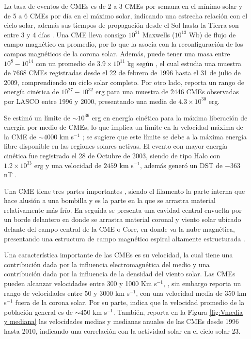 La tasa de eventos de CMEs es de 2 a 3 CMEs por semana en el mínimo solar y de 5 a 6 CMEs por día en el máximo solar, indicando una estrecha relación con el ciclo solar, además sus tiempos de propagación desde el Sol hasta la Tierra son entre 3 y 4 días \parencite[e.g.,][]{lugaz-2017}. Una CME lleva consigo $10^{21}$ Maxwells ($10^{13}$ Wb) de flujo de campo magnético en promedio, por lo que la asocia con la reconfiguración de los campos magnéticos de la corona solar. Además, puede tener una masa entre $10^{8} - 10^{14}$ con un promedio de $3.9\times10^{11}$ kg según \textcite[e.g.,][]{vourlidas-2010}, el cual estudia una muestra de $7668$ CMEs registradas desde el 22 de febrero de 1996 hasta el 31 de julio de 2009, comprendiendo un ciclo solar completo. Por otro lado, \textcite[][]{2002ESASP.506...91V} reporta un rango de energía cinética de $10^{27}-10^{32}$ erg para una muestra de 2446 CMEs observadas por \ac{LASCO} entre 1996 y 2000, presentando una media de $4.3\times10^{30}$ erg.

Se estimó un límite de $\sim 10^{36}$ erg en energía cinética para la máxima liberación de energía por medio de CMEs, lo que implica un límite en la velocidad máxima de la CME de $\sim 4000$ km s$^{-1}$ \parencite[e.g.,][]{gopalswamy2010catalog}; se sugiere que este límite se debe a la máxima energía libre disponible en las regiones solares activas. El evento con mayor energía cinética fue registrado el 28 de Octubre de 2003, siendo de tipo Halo con $1.2\times10^{33}$ erg y una velocidad de $2459$ km s$^{-1}$, además generó un \ac{DST} de $-363$ nT \parencite[e.g,][]{gopalswamy-2005}.

Una CME tiene tres partes importantes \parencite[e.g.,][]{fisher-1981}, siendo el filamento la parte interna que hace alusión a una bombilla y es la parte en la que se arrastra material relativamente más frío. En seguida se presenta una cavidad central envuelta por un borde delantero en donde se arrastra material coronal y viento solar ubicado delante del campo central de la CME o Core, en donde va la nube magnética, presentando una estructura de campo magnético espiral altamente estructurada \textcite[e.g.,][]{2014swcm.book.....H}.

Una característica importante de las \acp{CME} es su velocidad, la cual tiene una contribución dada por la influencia electromagnética del medio y una contribución dada por la influencia de la densidad del viento solar. Las CMEs pueden alcanzar velocidades entre 300 y 1000 Km s$^{-1}$, \parencite[e.g.,][]{2014swcm.book.....H}, sin embargo \textcite[e.g.,][]{zhang-2006} reporta un rango de velocidades entre 50 y 3000 km s$^{-1}$, con una velocidad media de 350 km s$^{-1}$ fuera de la corona solar. Por su parte, \textcite[e.g.,][]{gopalswamy-2004} indica que la velocidad promedio de la población general es de $\sim 450$ km s$^{-1}$. También, \textcite[e.g.,][]{webb-2012} reporta en la Figura \ref{fig:Vmedia y mediana} las velocidades medias y medianas anuales de las CMEs desde 1996 hasta 2010, indicando una correlación con la actividad solar en el ciclo solar 23.

